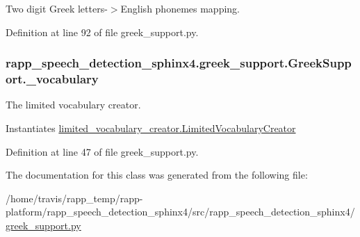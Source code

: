 Two digit Greek letters-\/$>$English phonemes mapping. 



Definition at line 92 of file greek\-\_\-support.\-py.

\hypertarget{classrapp__speech__detection__sphinx4_1_1greek__support_1_1GreekSupport_a8b56f58264cda651c142f84e1aff9d58}{
\subsubsection[{\-\_\-vocabulary}]{\setlength{\rightskip}{0pt plus 5cm}rapp\-\_\-speech\-\_\-detection\-\_\-sphinx4.\-greek\-\_\-support.\-Greek\-Support.\-\_\-vocabulary\hspace{0.3cm}{\ttfamily [private]}}}\label{classrapp__speech__detection__sphinx4_1_1greek__support_1_1GreekSupport_a8b56f58264cda651c142f84e1aff9d58}


The limited vocabulary creator. 

Instantiates \hyperlink{classrapp__speech__detection__sphinx4_1_1limited__vocabulary__creator_1_1LimitedVocabularyCreator}{limited\-\_\-vocabulary\-\_\-creator.\-Limited\-Vocabulary\-Creator} 

Definition at line 47 of file greek\-\_\-support.\-py.



The documentation for this class was generated from the following file\-:\begin{DoxyCompactItemize}
\item 
/home/travis/rapp\-\_\-temp/rapp-\/platform/rapp\-\_\-speech\-\_\-detection\-\_\-sphinx4/src/rapp\-\_\-speech\-\_\-detection\-\_\-sphinx4/\hyperlink{greek__support_8py}{greek\-\_\-support.\-py}\end{DoxyCompactItemize}
